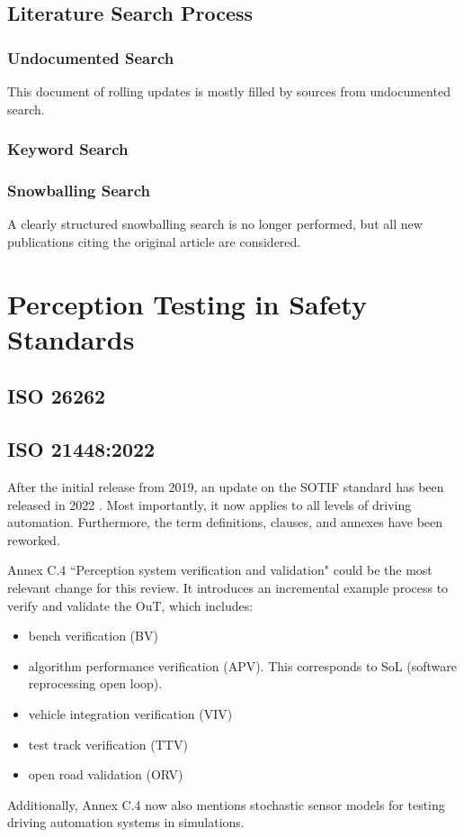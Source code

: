 \documentclass[conference]{IEEEtran}
\newcommand{\new}[1]{{\color{my-red}#1}}
\begin{document}
\subsection{Literature Search Process}
\subsubsection{Undocumented Search}
This document of rolling updates is mostly filled by sources from undocumented search.

\subsubsection{Keyword Search}
\subsubsection{Snowballing Search}
A clearly structured snowballing search is no longer performed, but all new publications citing the original article \cite{Hoss2022review} are considered.

\section{Perception Testing in Safety Standards}
\label{sec:standards}

\subsection{ISO 26262} 
\subsection{\new{ISO 21448:2022}} 

After the initial release from 2019, an update on the SOTIF standard has been released in 2022 \cite{iso2022sotif}. 
Most importantly, it now applies to all levels of driving automation. 
Furthermore, the term definitions, clauses, and annexes have been reworked. 

Annex C.4 ``Perception system verification and validation" could be the most relevant change for this review. 
It introduces an incremental example process to verify and validate the OuT, which includes: 
\begin{itemize}
\item bench verification (BV)
\item algorithm performance verification (APV). This corresponds to SoL (software reprocessing open loop).
\item vehicle integration verification (VIV)
\item test track verification (TTV)
\item open road validation (ORV)
\end{itemize}
Additionally, Annex C.4 now also mentions stochastic sensor models for testing driving automation systems in simulations. 
\end{document}
